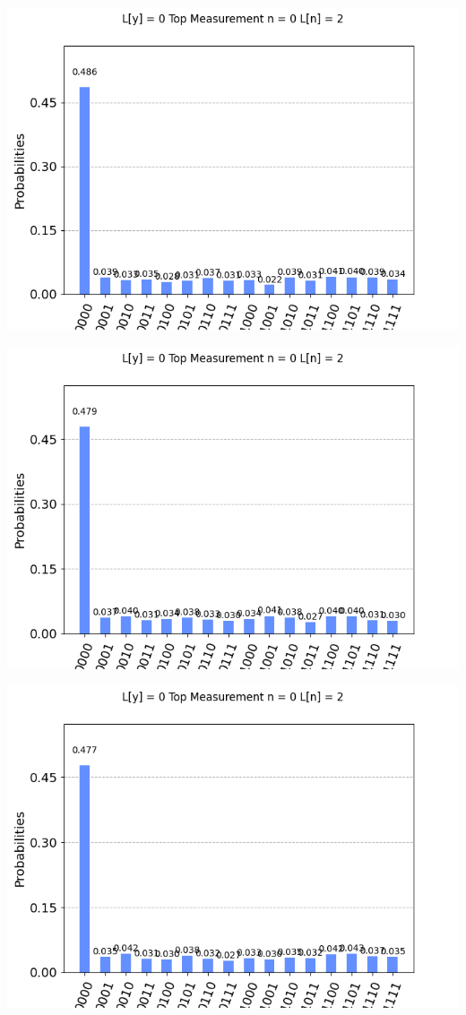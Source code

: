 \documentclass[11pt]{article}
\begin{document}
\begin{center}
\includegraphics[width=\textwidth]{logical_2.png}

\includegraphics[width=\textwidth]{logical_3.png}

\includegraphics[width=\textwidth]{logical_4.png}
\end{center}
\end{document}
